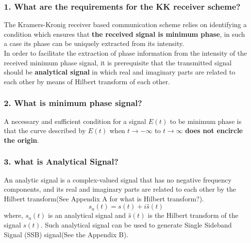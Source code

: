 \subsubsection{1. What are the requirements for the KK receiver scheme?}
The Kramers-Kronig receiver based communication scheme relies on identifying a condition which ensures that \textbf{the received signal is minimum phase}, in such a case its phase can be uniquely extracted from its intensity.\\ In order to facilitate the extraction of phase information from the intensity of the received minimum phase signal, it is prerequisite that the transmitted signal should be \textbf{analytical signal} in which real and imaginary parts are related to each other by means of Hilbert transform of each other.

\subsubsection{2. What is minimum phase signal?}
A necessary and sufficient condition for a signal $E(t)$ to be minimum phase is that the curve described by $E(t)$ when $t\rightarrow -\infty$ to $t\rightarrow \infty$ \textbf{does not encircle the origin}.

\subsubsection{3. what is Analytical Signal?}
An analytic signal is a complex-valued signal that has no negative frequency components, and its real and imaginary parts are related to each other by the Hilbert transform(See Appendix A for what is Hilbert transform?).
\begin{equation}
s_a(t)=s(t)+i\hat{s}(t)
\label{Analytical signal}
\end{equation}
where, $s_a(t)$ is an analytical signal and $\hat{s}(t)$ is the Hilbert transform of the signal ${s}(t)$. Such analytical signal can be used to generate Single Sideband Signal (SSB) signal(See the Appendix B).

